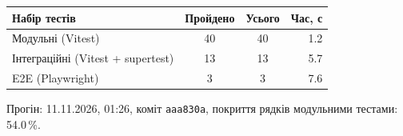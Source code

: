 \begin{tabular}{@{}lccr@{}}
\toprule
Набір тестів & Пройдено & Усього & Час, с\\
\midrule
Модульні (Vitest) & 40 & 40 & 1.2\\
Інтеграційні (Vitest + supertest) & 13 & 13 & 5.7\\
E2E (Playwright) & 3 & 3 & 7.6\\
\bottomrule
\end{tabular}

\smallskip\par{\small Прогін: 11.11.2026, 01:26, коміт \texttt{aaa830a}, покриття рядків модульними тестами: 54.0\,\%.}
